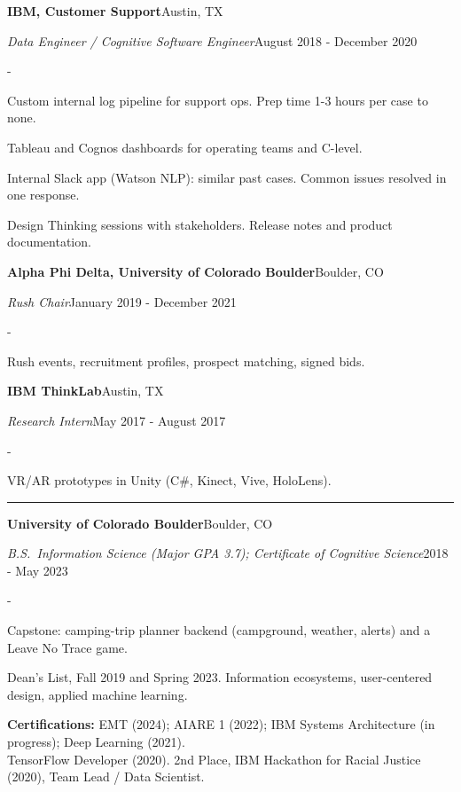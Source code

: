 \documentclass[10pt,letterpaper]{article}
\newenvironment{cvitems}{%
  \begin{list}{-}{%
    \setlength{\leftmargin}{12pt}%
    \setlength{\itemsep}{1.2pt}%
    \setlength{\parsep}{0pt}%
    \setlength{\topsep}{1.5pt}%
    \setlength{\partopsep}{0pt}%
    \setlength{\labelwidth}{6pt}%
    \setlength{\labelsep}{6pt}%
    \setlength{\itemindent}{0pt}%
  }%
}{\end{list}}
\newcommand{\cvsection}[1]{%
  \vspace{7pt}%
  \noindent{\bfseries\fontsize{11pt}{13pt}\selectfont\MakeUppercase{#1}}\par
  \vspace{1pt}%
  \noindent\rule{\textwidth}{0.4pt}\par
  \vspace{4pt}%
}
\newcommand{\cventryhead}[4]{%
  \noindent\textbf{#1}\hfill#2\par
  \vspace{0.5pt}%
  \noindent\textit{#3}\hfill#4\par
}
\newcommand{\cveduhead}[4]{%
  \noindent\textbf{#1}\hfill#2\par
  \vspace{0.5pt}%
  \noindent\textit{#3}\hfill#4\par
}
\begin{document}
\vspace{5pt}
\cventryhead{IBM, Customer Support}{Austin, TX}
{Data Engineer / Cognitive Software Engineer}{August 2018 - December 2020}
\begin{cvitems}
  \item Custom internal log pipeline for support ops. Prep time 1-3 hours per case to none.
  \item Tableau and Cognos dashboards for operating teams and C-level.
  \item Internal Slack app (Watson NLP): similar past cases. Common issues resolved in one response.
  \item Design Thinking sessions with stakeholders. Release notes and product documentation.
\end{cvitems}

\vspace{5pt}
\cventryhead{Alpha Phi Delta, University of Colorado Boulder}{Boulder, CO}
{Rush Chair}{January 2019 - December 2021}
\begin{cvitems}
  \item Rush events, recruitment profiles, prospect matching, signed bids.
\end{cvitems}

\vspace{5pt}
\cventryhead{IBM ThinkLab}{Austin, TX}
{Research Intern}{May 2017 - August 2017}
\begin{cvitems}
  \item VR/AR prototypes in Unity (C\#, Kinect, Vive, HoloLens).
\end{cvitems}

\cvsection{Education}

\cveduhead{University of Colorado Boulder}{Boulder, CO}
{B.S.\ Information Science (Major GPA 3.7); Certificate of Cognitive Science}{2018 - May 2023}
\begin{cvitems}
  \item Capstone: camping-trip planner backend (campground, weather, alerts) and a Leave No Trace game.
  \item Dean's List, Fall 2019 and Spring 2023. Information ecosystems, user-centered design, applied machine learning.
\end{cvitems}

\vspace{5pt}
\noindent\textbf{Certifications:} EMT (2024); AIARE 1 (2022); IBM Systems Architecture (in progress); Deep Learning (2021).\\
TensorFlow Developer (2020). 2nd Place, IBM Hackathon for Racial Justice (2020), Team Lead / Data Scientist.
\end{document}
